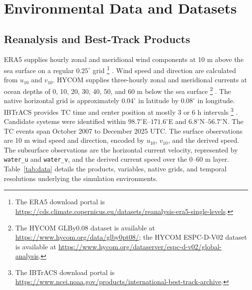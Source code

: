 \documentclass[a4paper,fleqn]{cas-dc}
\begin{document}
\section{Environmental Data and Datasets}\label{sec:data}

\subsection{Reanalysis and Best-Track Products}

ERA5 supplies hourly zonal and meridional wind components at 10 m above the sea
surface on a regular $0.25^\circ$ grid
\footnote{The ERA5 download portal is
\url{https://cds.climate.copernicus.eu/datasets/reanalysis-era5-single-levels}.}
\citep{r37}. Wind speed and direction are calculated from
$u_{10}$ and $v_{10}$. HYCOM supplies three-hourly zonal and meridional
currents at ocean depths of 0, 10, 20, 30, 40, 50, and 60 m below the sea
surface
\footnote{\raggedright The HYCOM GLBy0.08 dataset is available at\newline
\url{https://www.hycom.org/data/glby0pt08/};\newline
the HYCOM ESPC-D-V02 dataset is available at\newline
\url{https://www.hycom.org/dataserver/espc-d-v02/global-analysis}.}
\citep{r38}. The native horizontal grid is
approximately $0.04^\circ$ in latitude by $0.08^\circ$ in longitude. IBTrACS
provides TC time and center position at mostly 3 or 6 h intervals
\footnote{The IBTrACS download portal is
\url{https://www.ncei.noaa.gov/products/international-best-track-archive}.}
\citep{r39}.
Candidate systems were identified within
$98.7^\circ$E--$171.6^\circ$E and $6.8^\circ$N--$56.7^\circ$N. The TC events
span October 2007 to December 2025 UTC. The surface observations are 10 m wind
speed and direction, encoded by \(u_{10}\), \(v_{10}\), and the derived speed.
The subsurface observations are the horizontal current velocity, represented
by \texttt{water\_u} and \texttt{water\_v}, and the derived current speed over
the 0--60 m layer.
Table~\ref{tab:data} details the products, variables, native grids, and temporal
resolutions underlying the simulation environments.
\end{document}
